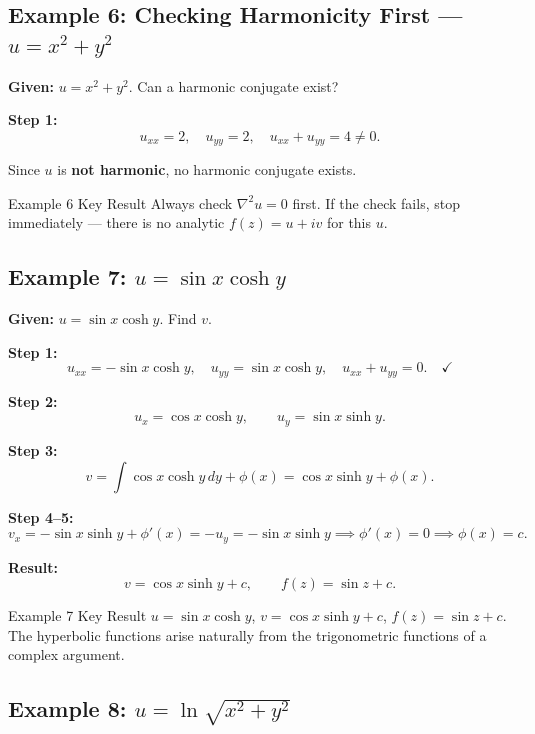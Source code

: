 \documentclass[12pt,a4paper]{article}
\begin{document}
\subsection*{Example 6: Checking Harmonicity First --- $u = x^2 + y^2$}

\textbf{Given:} $u=x^2+y^2$. Can a harmonic conjugate exist?

\medskip
\textbf{Step 1:}
\[
  u_{xx}=2,\quad u_{yy}=2,\quad u_{xx}+u_{yy}=4\neq0.
\]

Since $u$ is \textbf{not harmonic}, no harmonic conjugate exists.

\begin{learnbox}{Example 6 Key Result}
Always check $\nabla^2 u=0$ first. If the check fails, stop immediately --- there is no
analytic $f(z)=u+iv$ for this $u$.
\end{learnbox}

\subsection*{Example 7: $u = \sin x\cosh y$}

\textbf{Given:} $u=\sin x\cosh y$. Find $v$.

\medskip
\textbf{Step 1:}
\[
  u_{xx}=-\sin x\cosh y,\quad u_{yy}=\sin x\cosh y,\quad u_{xx}+u_{yy}=0.\quad\checkmark
\]

\textbf{Step 2:}
\[
  u_x=\cos x\cosh y,\qquad u_y=\sin x\sinh y.
\]

\textbf{Step 3:}
\[
  v=\int\cos x\cosh y\,dy+\phi(x)=\cos x\sinh y+\phi(x).
\]

\textbf{Step 4--5:}
\[
  v_x=-\sin x\sinh y+\phi'(x)=-u_y=-\sin x\sinh y \implies \phi'(x)=0 \implies \phi(x)=c.
\]

\textbf{Result:}
\[
  \boxed{v=\cos x\sinh y+c,\qquad f(z)=\sin z+c.}
\]

\begin{learnbox}{Example 7 Key Result}
$u=\sin x\cosh y$, $v=\cos x\sinh y+c$, $f(z)=\sin z+c$. The hyperbolic functions arise
naturally from the trigonometric functions of a complex argument.
\end{learnbox}

\subsection*{Example 8: $u = \ln\!\sqrt{x^2+y^2}$}
\end{document}
